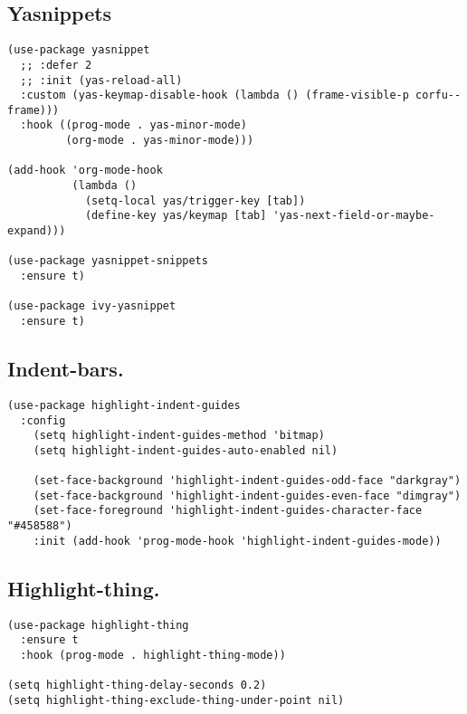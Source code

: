 \documentclass[11pt]{article}
\begin{document}
\subsection{Yasnippets}
\label{sec:orgaf87966}
\begin{verbatim}
(use-package yasnippet
  ;; :defer 2
  ;; :init (yas-reload-all)
  :custom (yas-keymap-disable-hook (lambda () (frame-visible-p corfu--frame)))
  :hook ((prog-mode . yas-minor-mode)
         (org-mode . yas-minor-mode)))

(add-hook 'org-mode-hook
          (lambda ()
            (setq-local yas/trigger-key [tab])
            (define-key yas/keymap [tab] 'yas-next-field-or-maybe-expand)))

(use-package yasnippet-snippets
  :ensure t)

(use-package ivy-yasnippet
  :ensure t)
\end{verbatim}
\subsection{Indent-bars.}
\label{sec:orgf7263e9}
\begin{verbatim}
(use-package highlight-indent-guides
  :config
    (setq highlight-indent-guides-method 'bitmap)
    (setq highlight-indent-guides-auto-enabled nil)

    (set-face-background 'highlight-indent-guides-odd-face "darkgray")
    (set-face-background 'highlight-indent-guides-even-face "dimgray")
    (set-face-foreground 'highlight-indent-guides-character-face "#458588")
    :init (add-hook 'prog-mode-hook 'highlight-indent-guides-mode))
\end{verbatim}
\subsection{Highlight-thing.}
\label{sec:org2087579}
\begin{verbatim}
(use-package highlight-thing
  :ensure t
  :hook (prog-mode . highlight-thing-mode))

(setq highlight-thing-delay-seconds 0.2)
(setq highlight-thing-exclude-thing-under-point nil)
\end{verbatim}
\end{document}
